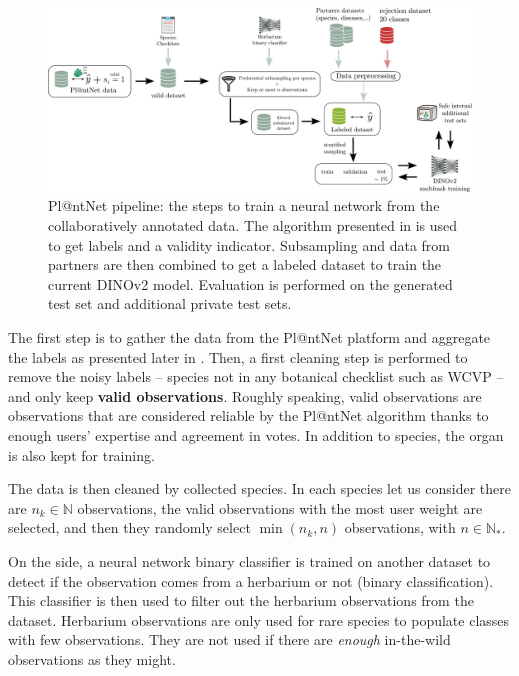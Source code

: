 \begin{figure}[htbp]
    \centering
    \includegraphics[width=\textwidth]{./images_plantnet/training_network.pdf}
    \caption{Pl@ntNet pipeline: the steps to train a neural network from the collaboratively annotated data. The algorithm presented in  is used to get labels and a validity indicator. Subsampling and data from partners are then combined to get a labeled dataset to train the current DINOv2 model. Evaluation is performed on the generated test set and additional private test sets.}
    \label{fig:training_plantnet}
\end{figure}

The first step is to gather the data from the Pl@ntNet platform and aggregate the labels as presented later in .
Then, a first cleaning step is performed to remove the noisy labels -- species not in any botanical checklist such as WCVP -- and only keep \textbf{valid observations}. Roughly speaking, valid observations are observations that are considered reliable by the Pl@ntNet algorithm thanks to enough users' expertise and agreement in votes.
In addition to species, the organ is also kept for training.

The data is then cleaned by collected species.
In each species let us consider there are $n_k\in\mathbb{N}$ observations, the valid observations with the most user weight are selected, and then they randomly select $\min(n_k, n)$ observations, with $n\in\mathbb{N}_*$.

On the side, a neural network binary classifier is trained on another dataset to detect if the observation comes from a herbarium or not (binary classification). This classifier is then used to filter out the herbarium observations from the dataset. Herbarium observations are only used for rare species to populate classes with few observations. They are not used if there are \emph{enough} in-the-wild observations as they might.

